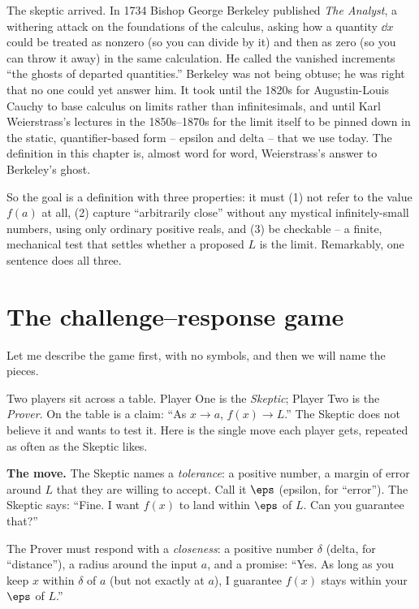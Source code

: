 \begin{historybox}
The skeptic arrived. In 1734 Bishop George Berkeley published \emph{The Analyst},
a withering attack on the foundations of the calculus, asking how a quantity
$\dd x$ could be treated as nonzero (so you can divide by it) and then as zero
(so you can throw it away) in the same calculation. He called the vanished
increments ``the ghosts of departed quantities.'' Berkeley was not being
obtuse; he was right that no one could yet answer him. It took until the 1820s
for Augustin-Louis Cauchy to base calculus on limits rather than infinitesimals,
and until Karl Weierstrass's lectures in the 1850s--1870s for the limit itself
to be pinned down in the static, quantifier-based form -- epsilon and delta --
that we use today. The definition in this chapter is, almost word for word,
Weierstrass's answer to Berkeley's ghost.
\end{historybox}

So the goal is a definition with three properties: it must (1) not refer to the
value $f(a)$ at all, (2) capture ``arbitrarily close'' without any mystical
infinitely-small numbers, using only ordinary positive reals, and (3) be
checkable -- a finite, mechanical test that settles whether a proposed $L$ is
the limit. Remarkably, one sentence does all three.

\section{The challenge--response game}
\label{ch06:game}

Let me describe the game first, with no symbols, and then we will name the
pieces.

Two players sit across a table. Player One is the \emph{Skeptic}; Player Two is
the \emph{Prover}. On the table is a claim: ``As $x \to a$, $f(x) \to L$.'' The
Skeptic does not believe it and wants to test it. Here is the single move each
player gets, repeated as often as the Skeptic likes.

\begin{focusbox}
\textbf{The move.} The Skeptic names a \emph{tolerance}: a positive number, a
margin of error around $L$ that they are willing to accept. Call it $\eps$
(epsilon, for ``error''). The Skeptic says: ``Fine. I want $f(x)$ to land
within $\eps$ of $L$. Can you guarantee that?''

The Prover must respond with a \emph{closeness}: a positive number $\delta$
(delta, for ``distance''), a radius around the input $a$, and a promise: ``Yes.
As long as you keep $x$ within $\delta$ of $a$ (but not exactly at $a$), I
guarantee $f(x)$ stays within your $\eps$ of $L$.''
\end{focusbox}

